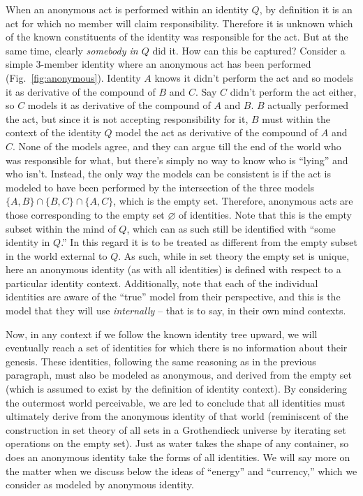 \documentclass[pra,twocolumn,groupedaddress,10pt]{revtex4}
\theoremstyle{definition}
\begin{document}
When an anonymous act is performed within an identity $Q$, by definition it is an act for which no member will claim responsibility. Therefore it is unknown which of the known constituents of the identity was responsible for the act. But at the same time, clearly \textit{somebody in $Q$} did it. How can this be captured? Consider a simple 3-member identity where an anonymous act has been performed (Fig.~\ref{fig:anonymous}). Identity $A$ knows it didn't perform the act and so models it as derivative of the compound of $B$ and $C$. Say $C$ didn't perform the act either, so $C$ models it as derivative of the compound of $A$ and $B$. $B$ actually performed the act, but since it is not accepting responsibility for it, $B$ must within the context of the identity $Q$ model the act as derivative of the compound of $A$ and $C$. None of the models agree, and they can argue till the end of the world who was responsible for what, but there's simply no way to know who is ``lying'' and who isn't. Instead, the only way the models can be consistent is if the act is modeled to have been performed by the intersection of the three models $\{A, B\} \cap \{B, C\} \cap \{A, C\}$, which is the empty set. Therefore, anonymous acts are those corresponding to the empty set $\varnothing$ of identities. Note that this is the empty subset within the mind of $Q$, which can as such still be identified with ``some identity in $Q$.'' In this regard it is to be treated as different from the empty subset in the world external to $Q$. As such, while in set theory the empty set is unique, here an anonymous identity (as with all identities) is defined with respect to a particular identity context. Additionally, note that each of the individual identities are aware of the ``true'' model from their perspective, and this is the model that they will use \textit{internally} -- that is to say, in their own mind contexts.

Now, in any context if we follow the known identity tree upward, we will eventually reach a set of identities for which there is no information about their genesis. These identities, following the same reasoning as in the previous paragraph, must also be modeled as anonymous, and derived from the empty set (which is assumed to exist by the definition of identity context). By considering the outermost world perceivable, we are led to conclude that all identities must ultimately derive from the anonymous identity of that world (reminiscent of the construction in set theory of all sets in a Grothendieck universe by iterating set operations on the empty set). Just as water takes the shape of any container, so does an anonymous identity take the forms of all identities. We will say more on the matter when we discuss below the ideas of ``energy'' and ``currency,'' which we consider as modeled by anonymous identity.
\end{document}
